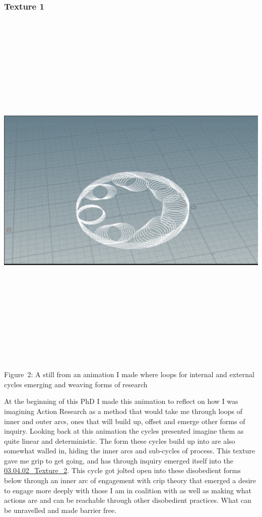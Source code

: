 \hypertarget{texture-1}{%
\subsubsection[Texture
1]{\texorpdfstring{\protect\hypertarget{anchor}{}{}Texture
1}{Texture 1}}\label{texture-1}}

\includegraphics[width=11.93056in,height=7.01389in]{../../Chapters/media_03_Disobedient_Action_Research_Cycles/Pictures/1.png}

Figure~2: A still from an animation I made where loops for internal and
external cycles emerging and weaving forms of research

At the beginning of this PhD I made this animation to reflect on how I
was imagining Action Research as a method that would take me through
loops of inner and outer arcs, ones that will build up, offset and
emerge other forms of inquiry. Looking back at this animation the cycles
presented imagine them as quite linear and deterministic. The form these
cycles build up into are also somewhat walled in, hiding the inner arcs
and sub-cycles of process. This texture gave me grip to get going, and
has through inquiry emerged itself into the
\href{03.04.02_Texture_2.md}{03.04.02\_Texture\_2}. This cycle got
jolted open into these disobedient forms below through an inner arc of
engagement with crip theory that emerged a desire to engage more deeply
with those I am in coalition with as well as making what actions are and
can be reachable through other disobedient practices. What can be
unravelled and made barrier free.

